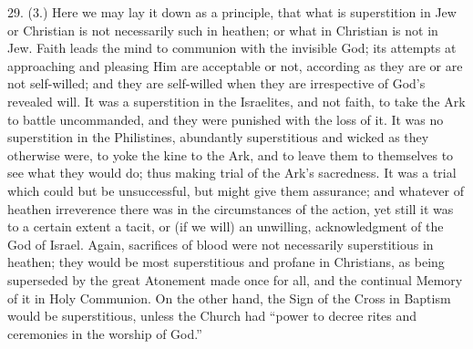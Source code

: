 29. (3.) Here we may lay it down as a principle, that what is
superstition in Jew or Christian is not necessarily such in heathen;
or what in Christian is not in Jew. Faith leads the mind to communion
with the invisible God; its attempts at approaching and pleasing Him
are acceptable or not, according as they are or are not self-willed;
and they are self-willed when they are irrespective of God's revealed
will. It was a superstition in the Israelites, and not faith, to take
the Ark to battle uncommanded, and they were punished with the loss of
it. It was no superstition in the Philistines, abundantly
superstitious and wicked as they otherwise were, to yoke the kine to
the Ark, and to leave them to themselves to see what they would do;
thus making trial of the Ark's sacredness. It was a trial which could
but be unsuccessful, but might give them assurance; and whatever of
heathen irreverence there was in the circumstances of the action, yet
still it was to a certain extent a tacit, or (if we will) an
unwilling, acknowledgment of the God of Israel. Again, sacrifices of
blood were not necessarily superstitious in heathen; they would be
most superstitious and profane in Christians, as being superseded by
the great Atonement made once for all, and the continual Memory of it
in Holy Communion. On the other hand, the Sign of the Cross in Baptism
would be superstitious, unless the Church had ``power to decree
rites and ceremonies in the worship of God.''

